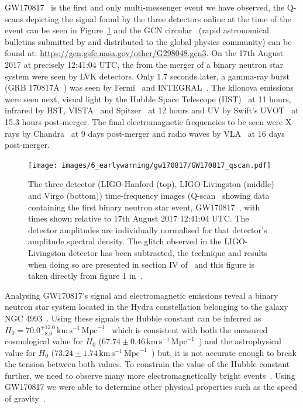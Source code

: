 GW170817~\cite{GW170817:2017} is the first and only multi-messenger event we have observed, the Q-scans depicting the \gwadj signal found by the three detectors online at the time of the event can be seen in Figure~\ref{6:fig:gw170817_qscan} and the GCN circular~\cite{gcn_circulars:2024} (rapid astronomical bulletins submitted by and distributed to the global physics community) can be found at: \href{https://gcn.gsfc.nasa.gov/other/G298048.gcn3}{https://gcn.gsfc.nasa.gov/other/G298048.gcn3}. On the 17th August 2017 at precisely 12:41:04 UTC, the \gws from the merger of a binary neutron star system were seen by LVK detectors. Only $1.7$ seconds later, a gamma-ray burst (GRB 170817A~\cite{gw170817_joint:2017}) was seen by Fermi~\cite{Fermi:2022, Fermi_GW170817:2017} and INTEGRAL~\cite{INTEGRAL:2003, INTEGRAL_GW170817:2017}. The kilonova emissions were seen next, visual light by the Hubble Space Telescope (HST)~\cite{HST:2000, HST_GW170817:2021} at 11 hours, infrared by HST, VISTA~\cite{VISTA:2015, VISTA_GW170817:2017} and Spitzer~\cite{Spitzer:2004, Spitzer_GW170817:2018} at 12 hours and UV by Swift's UVOT~\cite{Swift:2004, Swift_GW170817:2017} at 15.3 hours post-merger. The final electromagnetic frequencies to be seen were X-rays by Chandra~\cite{Chandra_GW170817:2017} at 9 days post-merger and radio waves by VLA~\cite{VLA:2019, VLA_GW170817:2017} at 16 days post-merger.
%
\begin{figure}
    \centering
    \texttt{[image: images/6\_earlywarning/gw170817/GW170817\_qscan.pdf]}
    \caption{The three detector (LIGO-Hanford (top), LIGO-Livingston (middle) and Virgo (bottom)) time-frequency images (Q-scan~\cite{qscan:2004} showing data containing the first binary neutron star \gwadj event, GW170817~\cite{GW170817:2017}, with times shown relative to 17th August 2017 12:41:04 UTC. The detector amplitudes are individually normalised for that detector's amplitude spectral density. The glitch observed in the LIGO-Livingston detector has been subtracted, the technique and results when doing so are presented in section IV of~\cite{GW170817:2017} and this figure is taken directly from figure 1 in~\cite{GW170817:2017}.}
    \label{6:fig:gw170817_qscan}
\end{figure}
%

Analysing GW170817's \gwadj signal and electromagnetic emissions reveal a binary neutron star system located in the Hydra constellation belonging to the galaxy NGC 4993~\cite{NGC4993:1998}. Using these signals the Hubble constant can be inferred as $H_0 = 70.0^{+12.0}_{-8.0} \, \text{km} \, \text{s}^{-1} \,\text{Mpc}^{-1}$~\cite{GW170817_H0:2017} which is consistent with both the measured cosmological value for $H_0$ ($67.74 \pm0.46 \, \text{km} \, \text{s}^{-1} \,\text{Mpc}^{-1}$~\cite{Planck_H0:2015}) and the astrophysical value for $H_0$ ($73.24 \pm1.74 \, \text{km} \, \text{s}^{-1} \,\text{Mpc}^{-1}$~\cite{Riess_H0:2016}) but, it is not accurate enough to break the tension between both values. To constrain the value of the Hubble constant further, we need to observe many more electromagnetically bright events~\cite{Palmese:2021}. Using GW170817 we were able to determine other physical properties such as the speed of gravity~\cite{Harry_speed_of_gravity:2022, Baker_speed_of_gravity:2022}.

